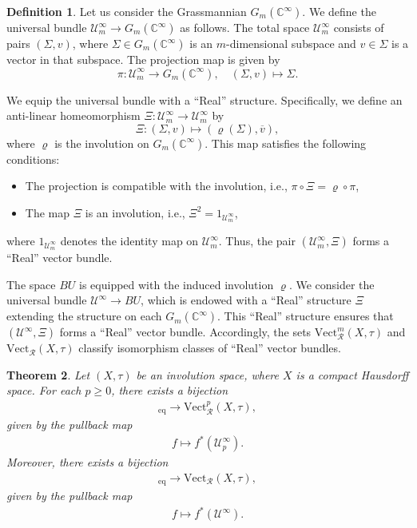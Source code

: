 \documentclass{amsart}
\newtheorem{thm}{Theorem}[section]
\theoremstyle{definition}
\newtheorem{dfn}[thm]{Definition}
\theoremstyle{remark}
\begin{document}
\begin{dfn}
Let us consider the Grassmannian \( G_m(\mathbb{C}^\infty) \). We define the universal bundle \( \mathcal{U}_m^\infty \to G_m(\mathbb{C}^\infty) \) as follows. The total space \( \mathcal{U}_m^\infty \) consists of pairs \( (\Sigma, v) \), where \( \Sigma \in G_m(\mathbb{C}^\infty) \) is an \( m \)-dimensional subspace and \( v \in \Sigma \) is a vector in that subspace. The projection map is given by
\[
\pi \colon \mathcal{U}_m^\infty \to G_m(\mathbb{C}^\infty), \quad (\Sigma, v) \mapsto \Sigma.
\]
\end{dfn}
We equip the universal bundle with a “Real” structure. Specifically, we define an anti-linear homeomorphism \( \Xi \colon \mathcal{U}_m^\infty \to \mathcal{U}_m^\infty \) by
\[
\Xi \colon (\Sigma, v) \mapsto (\varrho(\Sigma), \overline{v}),
\]
where \( \varrho \) is the involution on \( G_m(\mathbb{C}^\infty) \). This map satisfies the following conditions:
\begin{itemize}
    \item The projection is compatible with the involution, i.e., \( \pi \circ \Xi = \varrho \circ \pi \),
    \item The map \( \Xi \) is an involution, i.e., \( \Xi^2 = 1_{\mathcal{U}_m^\infty} \),
\end{itemize}
where \( 1_{\mathcal{U}_m^\infty} \) denotes the identity map on \( \mathcal{U}_m^\infty \). Thus, the pair \( (\mathcal{U}_m^\infty, \Xi) \) forms a “Real” vector bundle. 

The space \( BU \) is equipped with the induced involution \( \varrho \). We consider the universal bundle \( \mathcal{U}^\infty \to BU \), which is endowed with a “Real” structure \( \Xi \) extending the structure on each \( G_m(\mathbb{C}^\infty) \). This “Real” structure ensures that \( (\mathcal{U}^\infty, \Xi) \) forms a “Real” vector bundle. 
Accordingly, the sets \(\mathrm{Vect}_{\mathcal{R}}^m(X,\tau)\) and \(\mathrm{Vect}_{\mathcal{R}}(X,\tau)\) classify isomorphism classes of “Real” vector bundles.

\begin{thm}\label{thm:classyfy}
Let \( (X, \tau) \) be an involution space, where \( X \) is a compact Hausdorff space. For each \( p \geq 0 \), there exists a bijection
\begin{align*}
[X, BU(p)]_{\text{eq}} \to \text{Vect}_{\mathcal{R}}^p(X, \tau),
\end{align*}
given by the pullback map
\begin{align*}
f \mapsto f^*(\mathcal{U}_p^\infty).
\end{align*}
Moreover, there exists a bijection
\begin{align*}
[X, BU]_{\text{eq}} \to \text{Vect}_{\mathcal{R}}(X, \tau),
\end{align*}
given by the pullback map
\begin{align*}
f \mapsto f^*(\mathcal{U}^\infty).
\end{align*}
\end{thm}
\end{document}

